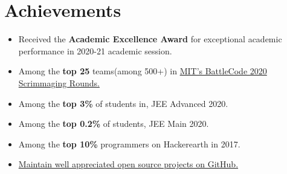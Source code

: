 \section*{\sc Achievements}
\vspace{-2mm}
\hrulefill
\vspace{1mm}

\begin{itemize}
    \item Received the \textbf{Academic Excellence Award} for exceptional academic performance in 2020-21 academic session.
    \item Among the \textbf{top 25} teams(among 500+) in  \href{https://github.com/abhishekshree/BattleCode}{MIT's BattleCode 2020 Scrimmaging Rounds.}
    \item Among the\textbf{ top 3\%} of students in, JEE Advanced 2020.
    \item Among the \textbf{top 0.2\%} of students, JEE Main 2020.
    \item Among the \textbf{top 10\%} programmers on Hackerearth in 2017.
    \item \href{https://github.com/abhishekshree/}{Maintain well appreciated open source projects on GitHub.}
\end{itemize}
